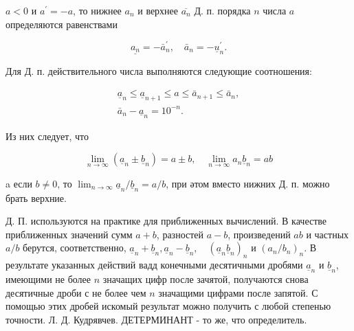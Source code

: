 \documentclass[10pt]{article}
\begin{document}
$a<0$ и $a^{\prime}=-a$, то нижнее $a_{n}$ и верхнее $\overline{a_{n}}$ Д. п. порядка $n$ числа $a$ определяются равенствами



\[

\underline{a_{n}}=-\bar{a}_{n}^{\prime}, \quad \bar{a}_{n}=-\underline{u}_{n}^{\prime} .

\]



Для Д. п. действительного числа выполняются следующие соотношения:



\[

\begin{gathered}

\underline{a}_{n} \leqslant \underline{a}_{n+1} \leqslant a \leqslant \bar{a}_{n+1} \leqslant \bar{a}_{n}, \\

\bar{a}_{n}-\underline{a}_{n}=10^{-n} .

\end{gathered}

\]



Из них следует, что



\[

\lim _{n \rightarrow \infty}\left(\underline{a}_{n} \pm \underline{b}_{n}\right)=a \pm b, \quad \lim _{n \rightarrow \infty} a_{n} \underline{b}_{n}=a b

\]



a если $b \neq 0$, то $\lim _{n \rightarrow \infty} \underline{a}_{n} / \underline{b}_{n}=a / b$, при әтом вместо нижних Д. п. можно брать верхние.



Д. П. используются на практике для приближенных вычислений. В качестве приближенных значений сумм $a+b$, разностей $a-b$, произведений $a b$ и частных $a / b$ берутся, соответственно, $\underline{a}_{n}+\underline{b}_{n}, \underline{a}_{n}-\underline{b}_{n}, \quad\left(\underline{a}_{n} \underline{b}_{n}\right)_{n}$ и $\left(a_{n} / b_{n}\right)_{n}$. В результате указанных действий вадд конечными десятичными дробями $\underline{a}_{n}$ и $\underline{b}_{n}$, имеющими не более $n$ значащих цифр после зачятой, получаются снова десятичные дроби с не более чем $n$ значащими цифрами после запятой. С помощью этих дробей искомый результат можно получить с любой степенью точности. Л. Д. Кудрявчев. ДЕТЕРМИНАНТ - то же, что определитель.
\end{document}
